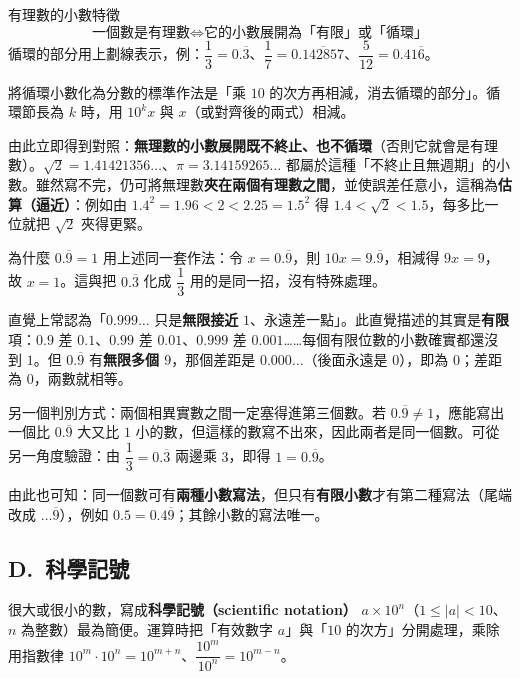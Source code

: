 \documentclass[11pt]{article}
\begin{document}
\begin{補充框}{有理數的小數特徵}
$$\boxed{\;\text{一個數是有理數}\iff\text{它的小數展開為「有限」或「循環」}\;}$$
循環的部分用上劃線表示，例：$\dfrac13=0.\overline{3}$、$\dfrac{1}{7}=0.\overline{142857}$、$\dfrac{5}{12}=0.41\overline{6}$。

將循環小數化為分數的標準作法是「乘 $10$ 的次方再相減，消去循環的部分」。循環節長為 $k$ 時，用 $10^k x$ 與 $x$（或對齊後的兩式）相減。
\end{補充框}

由此立即得到對照：\textbf{無理數的小數展開既不終止、也不循環}（否則它就會是有理數）。$\sqrt2=1.41421356\ldots$、$\pi=3.14159265\ldots$ 都屬於這種「不終止且無週期」的小數。雖然寫不完，仍可將無理數\textbf{夾在兩個有理數之間}，並使誤差任意小，這稱為\textbf{估算（逼近）}：例如由 $1.4^2=1.96<2<2.25=1.5^2$ 得 $1.4<\sqrt2<1.5$，每多比一位就把 $\sqrt2$ 夾得更緊。

\begin{補充框}{為什麼 $0.\overline{9}=1$}
用上述同一套作法：令 $x=0.\overline{9}$，則 $10x=9.\overline{9}$，相減得 $9x=9$，故 $x=1$。這與把 $0.\overline{3}$ 化成 $\dfrac13$ 用的是同一招，沒有特殊處理。

直覺上常認為「$0.999\ldots$ 只是\textbf{無限接近} $1$、永遠差一點」。此直覺描述的其實是\textbf{有限}項：$0.9$ 差 $0.1$、$0.99$ 差 $0.01$、$0.999$ 差 $0.001$……每個有限位數的小數確實都還沒到 $1$。但 $0.\overline{9}$ 有\textbf{無限多個 $9$}，那個差距是 $0.000\ldots$（後面永遠是 $0$），即為 $0$；差距為 $0$，兩數就相等。

另一個判別方式：兩個相異實數之間一定塞得進第三個數。若 $0.\overline{9}\ne1$，應能寫出一個比 $0.\overline{9}$ 大又比 $1$ 小的數，但這樣的數寫不出來，因此兩者是同一個數。可從另一角度驗證：由 $\dfrac13=0.\overline{3}$ 兩邊乘 $3$，即得 $1=0.\overline{9}$。

由此也可知：同一個數可有\textbf{兩種小數寫法}，但只有\textbf{有限小數}才有第二種寫法（尾端改成 $\ldots\overline{9}$），例如 $0.5=0.4\overline{9}$；其餘小數的寫法唯一。
\end{補充框}

\subsection*{\sffamily D.\ 科學記號}

很大或很小的數，寫成\textbf{科學記號（scientific notation）} $a\times10^n$（$1\le|a|<10$、$n$ 為整數）最為簡便。運算時把「有效數字 $a$」與「$10$ 的次方」分開處理，乘除用指數律 $10^m\cdot10^n=10^{m+n}$、$\dfrac{10^m}{10^n}=10^{m-n}$。
\end{document}
